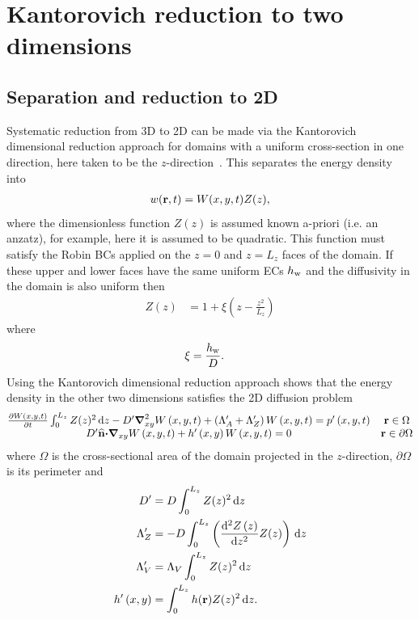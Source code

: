\documentclass[a4paper]{article}
\numberwithin{equation}{section}
\begin{document}
\section[Kantorovich reduction to two dimensions]{Kantorovich reduction to two dimensions}
\label{sc:Kant}

\subsection[Separation and reduction to 2D]{Separation and reduction to 2D}
\label{sc:Kant:red}

Systematic reduction from 3D to 2D can be made via the Kantorovich dimensional
reduction approach for domains with a uniform cross-section in one direction,
here taken to be the $z$-direction~\citep{Sequeira2012}. This separates the energy density into
\begin{align}
w(\boldsymbol{\mathrm{r}},t) = W(x,y,t)Z(z),
\end{align}
where the dimensionless function $Z(z)$ is assumed known a-priori
(i.e. an anzatz), for example, here it is assumed to be quadratic. This function must
satisfy the Robin BCs applied on the  $z=0$ and  $z=L_z$ faces of the domain.
If these upper and lower faces have the same uniform ECs $h_{\mathrm{w}}$ and the
diffusivity in the domain is also uniform then
\begin{align}
Z(z) &= 1 + \xi\left( z-\frac{z^2}{L_z} \right)
\end{align}
where
\begin{align}
\xi &= \frac{h_{\mathrm{w}}} D.
\end{align}
Using the Kantorovich dimensional reduction approach shows that the energy
density in the other two dimensions satisfies the 2D diffusion problem~\citep{Kantorovich1964}
\begin{align}
\begin{matrix}
\frac{{\partial}W\left(x,y,t\right)}{{\partial}t}
\int_0^{L_z}Z(z)^2\,\mathrm{d}{z}
- D^\prime{\boldsymbol{\mathrm{\nabla}}}_{xy}^2W\left(x,y,t\right)
+ \left(\Lambda_A^\prime+\Lambda_Z^\prime\right)W\left(x,y,t\right)
= p^\prime\left(x,y,t\right)
& \boldsymbol{\mathrm{r}}\in\Omega\\
D^\prime\widehat{\boldsymbol{\mathrm{n}}}{\boldsymbol{\mathrm{\cdot}}}{\boldsymbol{\mathrm{\nabla}}}_{xy}W\left(x,y,t\right)+h^\prime\left(x,y\right)W\left(x,y,t\right)=0
&\boldsymbol{\mathrm{r}}\in\partial\Omega
\end{matrix}
\end{align}
where $\Omega$ is the cross-sectional area of the domain projected in the
$z$-direction, $\partial\Omega$ is its perimeter and
\begin{align}
D^\prime &= D \int_0^{L_z} Z(z)^2\,\mathrm{d}{z} \\
\Lambda_Z^\prime &= -D \int_0^{L_z} \left(\frac{\mathrm{d}^2Z\left(z\right)}{\mathrm{d} z^2}Z(z)\right)\,\mathrm{d}{z} \\
\Lambda_V^\prime &= \Lambda_V \int_0^{L_z} Z(z)^2\,\mathrm{d}{z} \\
h^\prime\left(x,y\right) &= \int_0^{L_z} h(\boldsymbol{\mathrm{r}}) Z(z)^2\,\mathrm{d}{z}.
\end{align}
\end{document}
